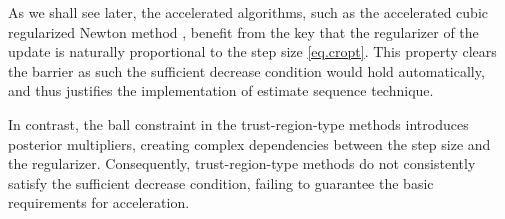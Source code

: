 \documentclass{article}
\begin{document}





As we shall see later, the accelerated algorithms, such as the accelerated cubic regularized Newton method \cite{nesterov2008accelerating}, benefit from the key that the regularizer of the update is naturally proportional to the step size \eqref{eq.cropt}. This property clears the barrier as such the sufficient decrease condition would hold automatically, and thus justifies the implementation of estimate sequence technique.

In contrast, the ball constraint in the trust-region-type methods introduces posterior multipliers, creating complex dependencies between the step size and the regularizer\cite{nocedal1999numerical,cartis2022evaluation}. Consequently, trust-region-type methods do not consistently satisfy the sufficient decrease condition, failing to guarantee the basic requirements for acceleration.
\end{document}
